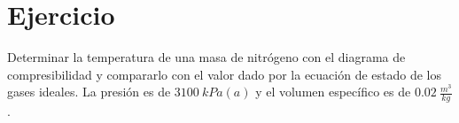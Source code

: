 \section{Ejercicio}\label{ej:Chap03Ejercicio11}
Determinar la temperatura de una masa de nitrógeno con el diagrama de compresibilidad y compararlo con el valor dado por la ecuación de estado de los gases ideales. La presión es de $\SI{3100}{kPa(a)}$ y el volumen específico es de $\SI{0.02}{\frac{m^3}{kg}}$.
